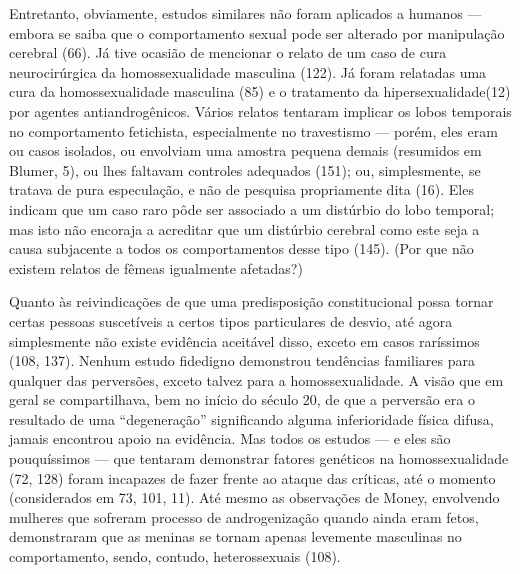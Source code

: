  Entretanto, obviamente, estudos similares não foram aplicados a humanos
--- embora se saiba que o comportamento sexual pode ser alterado por
manipulação cerebral\idxcerea{} (66). Já tive ocasião de mencionar o relato de um
caso de cura neurocirúrgica da homossexualidade masculina (122).\idxhomosbiol{} Já
foram relatadas uma cura da homossexualidade masculina (85) e o
tratamento da hipersexualidade\idxcerebhipe[|)] (12) por agentes antiandrogênicos.
Vários relatos tentaram implicar os lobos temporais\idxfeticlobo{} no comportamento
fetichista, especialmente no travestismo --- porém, eles eram ou casos
isolados, ou envolviam uma amostra pequena demais (resumidos em Blumer,\idxblumer{}
5), ou lhes faltavam controles adequados (151); ou, simplesmente, se
tratava de pura especulação, e não de pesquisa propriamente dita (16).
Eles indicam que um caso raro pôde ser associado a um distúrbio do lobo
temporal;\idxcerebepil{} mas isto não encoraja a acreditar que um distúrbio cerebral
como este seja a causa subjacente a todos os comportamentos desse tipo
(145). (Por que não existem relatos de fêmeas igualmente afetadas?)

 Quanto às reivindicações de que uma predisposição constitucional possa
tornar certas pessoas suscetíveis a certos tipos particulares de
desvio, até agora simplesmente não existe evidência aceitável disso,
exceto em casos raríssimos (108, 137). Nenhum estudo fidedigno
demonstrou tendências familiares para qualquer das perversões, exceto
talvez para a homossexualidade. A visão que em geral se compartilhava,
bem no início do século 20, de que a perversão era o resultado de uma
``degeneração'' significando alguma
inferioridade física difusa, jamais encontrou apoio na evidência. Mas
todos os estudos --- e eles são pouquíssimos --- que tentaram demonstrar
fatores genéticos\idxhomoshera{} na\idxhomosbiol{} homossexualidade\idxgenethomo{} (72, 128) foram incapazes de
fazer frente ao ataque das críticas, até o momento (considerados em 73,
101, 11). Até mesmo as observações de Money,\idxmoney{} envolvendo mulheres que
sofreram processo de androgenização\idxhormhomo{} quando ainda eram fetos,
demonstraram que as meninas se tornam apenas levemente masculinas no
comportamento, sendo, contudo, heterossexuais (108).

